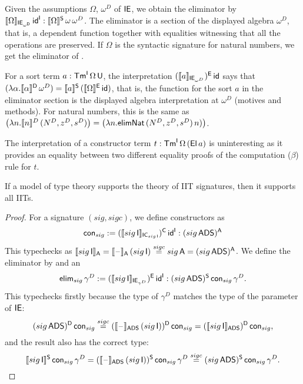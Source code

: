 \documentclass[a4paper,UKenglish,cleveref, autoref]{lipics-v2019}
\begin{document}
\begin{example}
  Given the assumptions $\Omega$, $\omega^D$ of $\mathsf{IE}$, we obtain the
  eliminator by
  $\llbracket\Omega\rrbracket_{\mathsf{IE}_{\omega^{\mathsf{D}}}}\,\mathsf{id}^{\mathsf{I}} :
  \llbracket\Omega\rrbracket^{\mathsf{S}}\,\omega\,\omega^D$. The eliminator is a section of
  the displayed algebra $\omega^D$, that is, a dependent function
  together with equalities witnessing that all the operations are
  preserved. If $\Omega$ is the syntactic signature for natural
  numbers, we get the eliminator of .

  For a sort term $a:\mathsf{Tm}^{\mathsf{I}}\,\Omega\,\mathsf{U}$, the interpretation
  $(\llbracket a\rrbracket_{\mathsf{IE}_{\omega^D}})^{\mathsf{E}}\,\mathsf{id}$ says that
  $(\lambda\alpha.\llbracket\alpha\rrbracket^{\mathsf{D}}\,\omega^D) = \llbracket
  a\rrbracket^{\mathsf{S}}\,(\llbracket\Omega\rrbracket^{\mathsf{E}}\,\mathsf{id})$, that is, the function for the sort
  $a$ in the eliminator section is the displayed algebra
  interpretation at $\omega^D$ (motives and methods). For natural
  numbers, this is the same as
  $\big(\lambda n.\llbracket n\rrbracket^D\,(N^D,z^D,s^D)\big) = \big(\lambda
  n.\mathsf{elimNat}\,(N^D,z^D,s^D)\,n)\big)$.

  The interpretation of a constructor term
  $t:\mathsf{Tm}^{\mathsf{I}}\,\Omega\,(\mathsf{El}\,a)$ is uninteresting as it provides an
  equality between two different equality proofs of the computation
  ($\beta$) rule for $t$.
\end{example}

\begin{theorem}
  If a model of type theory supports the theory of IIT signatures,
  then it supports all IITs.
\end{theorem}
\begin{proof}
  For a signature $({sig},{sigc})$, we define constructors as
  \[
    \mathsf{con}_{sig}:= (\llbracket{sig}\,\mathsf{I}\rrbracket_{\mathsf{IC}_{{sig}\,\mathsf{I}}})^{\mathsf{C}}\,\mathsf{id}^{\mathsf{I}} : ({sig}\,\mathsf{ADS})^{\mathsf{A}}
  \]
  This typechecks as
  $\llbracket{sig}\,\mathsf{I}\rrbracket_{\mathsf{A}} = \llbracket\mathord{\hspace{1pt}\text{--}\hspace{1pt}}\rrbracket_{\mathsf{A}}\,({sig}\,\mathsf{I})
  \overset{{sigc}}{=} {{sig}\,\mathsf{A}} = ({sig}\,\mathsf{ADS})^{\mathsf{A}}$. We define the
  eliminator by
  and an
  \[
    \mathsf{elim}_{sig}\,\gamma^D := (\llbracket{sig}\,\mathsf{I}\rrbracket_{\mathsf{IE}_{\gamma^D}})^{\mathsf{E}}\,\mathsf{id}^{\mathsf{I}}  : ({sig}\,\mathsf{ADS})^{\mathsf{S}}\,\mathsf{con}_{sig}\,\gamma^D.
  \]
  This typechecks firstly because the type of $\gamma^D$ matches the
  type of the parameter of $\mathsf{IE}$:
  \[
    ({sig}\,\mathsf{ADS})^{\mathsf{D}}\,\mathsf{con}_{sig} \overset{{sigc}}{=}
    (\llbracket\mathord{\hspace{1pt}\text{--}\hspace{1pt}}\rrbracket_{\mathsf{ADS}}\,({sig}\,\mathsf{I}))^{\mathsf{D}}\,\mathsf{con}_{sig} =
    (\llbracket{sig}\,\mathsf{I}\rrbracket_{\mathsf{ADS}})^{\mathsf{D}}\,\mathsf{con}_{sig},
  \]
  and the result also has the correct type:
  \[
    \llbracket{sig}\,\mathsf{I}\rrbracket^{\mathsf{S}}\,\mathsf{con}_{sig}\,\gamma^D = (\llbracket\mathord{\hspace{1pt}\text{--}\hspace{1pt}}\rrbracket_{\mathsf{ADS}}\,({sig}\,\mathsf{I}))^{\mathsf{S}}\,\mathsf{con}_{sig}\,\gamma^D \overset{{sigc}}{=} ({sig}\,\mathsf{ADS})^{\mathsf{S}}\,\mathsf{con}_{sig}\,\gamma^D.
  \]
\end{proof}
\end{document}

